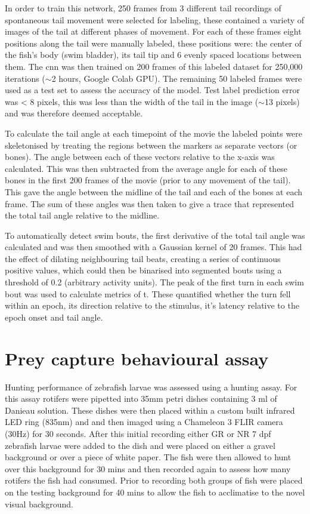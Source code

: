 In order to train this network, 250 frames from 3 different tail recordings of spontaneous tail movement were selected for labeling, these contained a variety of images of the tail at different phases of movement. For each of these frames eight positions along the tail were manually labeled, these positions were: the center of the fish's body (swim bladder), its tail tip and 6 evenly spaced locations between them. The \gls{cnn} was then trained on 200 frames of this labeled dataset for 250,000 iterations ($\sim$2 hours, Google Colab GPU). The remaining 50 labeled frames were used as a test set to assess the accuracy of the model. Test label prediction error was < 8 pixels, this was less than the width of the tail in the image ($\sim$13 pixels) and was therefore deemed acceptable. 

To calculate the tail angle at each timepoint of the movie the labeled points were skeletonised by treating the regions between the markers as separate vectors (or bones). The angle between each of these vectors relative to the x-axis was calculated. This was then subtracted from the average angle for each of these bones in the first 200 frames of the movie (prior to any movement of the tail). This gave the angle between the midline of the tail and each of the bones at each frame. The sum of these angles was then taken to give a trace that represented the total tail angle relative to the midline.

To automatically detect swim bouts, the first derivative of the total tail angle was calculated and was then smoothed with a Gaussian kernel of 20 frames. This had the effect of dilating neighbouring tail beats, creating a series of continuous positive values, which could then be binarised into segmented bouts using a threshold of 0.2 (arbitrary activity units). The peak of the first turn in each swim bout was used to calculate metrics of t. These quantified whether the turn fell within an epoch, its direction relative to the stimulus, it's latency relative to the epoch onset and tail angle.  


\section{Prey capture behavioural assay}
Hunting performance of zebrafish larvae was assessed using a hunting assay. For this assay rotifers were pipetted into 35mm petri dishes containing 3 ml of Danieau solution. These dishes were then placed within a custom built infrared LED ring (835nm) and and then imaged using a Chameleon 3 FLIR camera (30Hz) for 30 seconds. After this initial recording either GR or NR 7 \gls{dpf}  zebrafish larvae were added to the dish and were placed on either a gravel background or over a piece of white paper. The fish were then allowed to hunt over this background for 30 mins and then recorded again to assess how many rotifers the fish had consumed. Prior to recording both groups of fish were placed on the testing background for 40 mins to allow the fish to acclimatise to the novel visual background.


